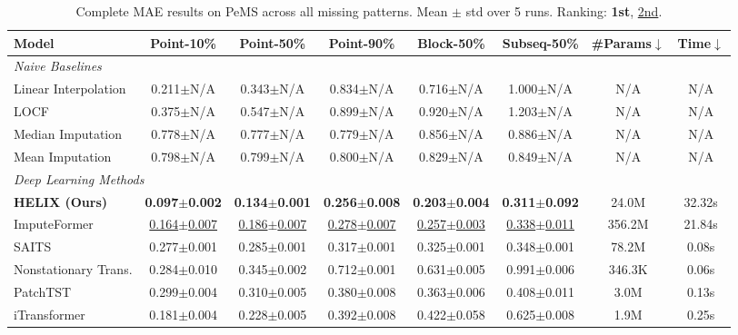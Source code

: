 \begin{table}[h]
    \caption{Complete MAE results on PeMS across all missing patterns. Mean $\pm$ std over 5 runs. Ranking: \textbf{1st}, \underline{2nd}.}
    \label{tab:full_pems}
    \centering
    \begin{footnotesize}
    \begin{tabular}{l|ccccc|cc}
        \toprule
        \textbf{Model} & \textbf{Point-10\%} & \textbf{Point-50\%} & \textbf{Point-90\%} & \textbf{Block-50\%} & \textbf{Subseq-50\%} & \textbf{\#Params}$\downarrow$ & \textbf{Time}$\downarrow$ \\
        \midrule
        \multicolumn{8}{l}{\textit{Naive Baselines}} \\
        Linear Interpolation & 0.211$\pm$N/A & 0.343$\pm$N/A & 0.834$\pm$N/A & 0.716$\pm$N/A & 1.000$\pm$N/A & N/A & N/A \\
        LOCF & 0.375$\pm$N/A & 0.547$\pm$N/A & 0.899$\pm$N/A & 0.920$\pm$N/A & 1.203$\pm$N/A & N/A & N/A \\
        Median Imputation & 0.778$\pm$N/A & 0.777$\pm$N/A & 0.779$\pm$N/A & 0.856$\pm$N/A & 0.886$\pm$N/A & N/A & N/A \\
        Mean Imputation & 0.798$\pm$N/A & 0.799$\pm$N/A & 0.800$\pm$N/A & 0.829$\pm$N/A & 0.849$\pm$N/A & N/A & N/A \\
        \midrule
        \multicolumn{8}{l}{\textit{Deep Learning Methods}} \\
        \textbf{HELIX (Ours)} & \textbf{0.097$\pm$0.002} & \textbf{0.134$\pm$0.001} & \textbf{0.256$\pm$0.008} & \textbf{0.203$\pm$0.004} & \textbf{0.311$\pm$0.092} & 24.0M & 32.32s \\
        ImputeFormer & \underline{0.164$\pm$0.007} & \underline{0.186$\pm$0.007} & \underline{0.278$\pm$0.007} & \underline{0.257$\pm$0.003} & \underline{0.338$\pm$0.011} & 356.2M & 21.84s \\
        SAITS & 0.277$\pm$0.001 & 0.285$\pm$0.001 & 0.317$\pm$0.001 & 0.325$\pm$0.001 & 0.348$\pm$0.001 & 78.2M & 0.08s \\
        Nonstationary Trans. & 0.284$\pm$0.010 & 0.345$\pm$0.002 & 0.712$\pm$0.001 & 0.631$\pm$0.005 & 0.991$\pm$0.006 & 346.3K & 0.06s \\
        PatchTST & 0.299$\pm$0.004 & 0.310$\pm$0.005 & 0.380$\pm$0.008 & 0.363$\pm$0.006 & 0.408$\pm$0.011 & 3.0M & 0.13s \\
        iTransformer & 0.181$\pm$0.004 & 0.228$\pm$0.005 & 0.392$\pm$0.008 & 0.422$\pm$0.058 & 0.625$\pm$0.008 & 1.9M & 0.25s \\

\end{tabular}
\end{footnotesize}
\end{table}
